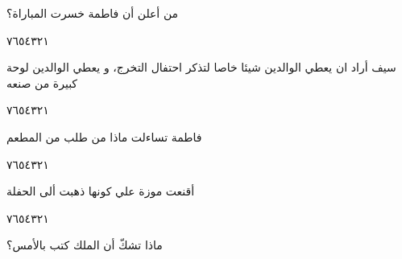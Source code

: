 \documentclass[11pt, a4paper]{article}
\begin{document}
{\vspace{0.5\baselineskip}\begin{flushright}
\textarabic{من أعلن أن فاطمة خسرت المباراة؟}
\end{flushright}

\begin{center}
        \hfill\textarabic{٧}\hfill\textarabic{٦}\hfill\textarabic{٥}\hfill\textarabic{٤}\hfill\textarabic{٣}\hfill\textarabic{٢}\hfill\textarabic{١}
        \end{center}


\vspace{0.5\baselineskip}\begin{flushright}
\textarabic{سيف أراد ان يعطي الوالدين شيئا خاصا لتذكر احتفال التخرج، و يعطي الوالدين لوحة كبيرة من صنعه}
\end{flushright}

\begin{center}
        \hfill\textarabic{٧}\hfill\textarabic{٦}\hfill\textarabic{٥}\hfill\textarabic{٤}\hfill\textarabic{٣}\hfill\textarabic{٢}\hfill\textarabic{١}
        \end{center}


\vspace{0.5\baselineskip}\begin{flushright}
\textarabic{فاطمة تساءلت ماذا من طلب من المطعم}
\end{flushright}

\begin{center}
        \hfill\textarabic{٧}\hfill\textarabic{٦}\hfill\textarabic{٥}\hfill\textarabic{٤}\hfill\textarabic{٣}\hfill\textarabic{٢}\hfill\textarabic{١}
        \end{center}


\vspace{0.5\baselineskip}\begin{flushright}
\textarabic{أقنعت موزة علي كونها ذهبت ألى الحفلة}
\end{flushright}

\begin{center}
        \hfill\textarabic{٧}\hfill\textarabic{٦}\hfill\textarabic{٥}\hfill\textarabic{٤}\hfill\textarabic{٣}\hfill\textarabic{٢}\hfill\textarabic{١}
        \end{center}


\vspace{0.5\baselineskip}\begin{flushright}
\textarabic{ماذا تشكّ أن الملك كتب بالأمس؟}
\end{flushright}

}
\end{document}
